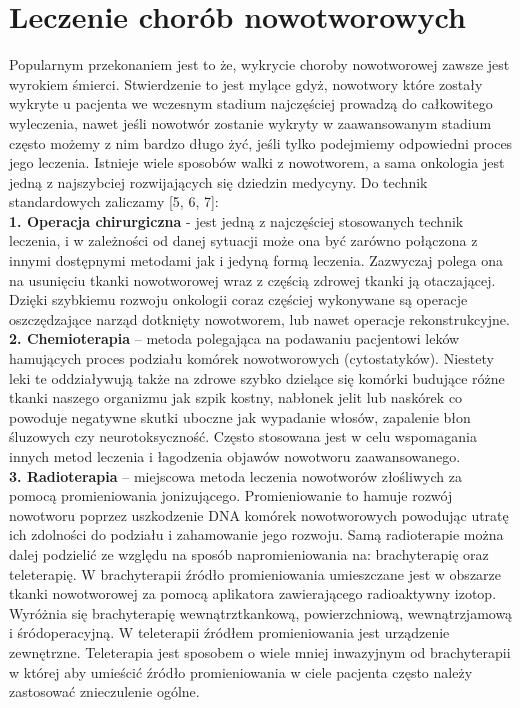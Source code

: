 \documentclass[a4paper,12pt,oneside]{book}
\begin{document}
\section{Leczenie chorób nowotworowych}
Popularnym przekonaniem jest to że, wykrycie choroby nowotworowej zawsze jest wyrokiem śmierci. Stwierdzenie to jest mylące gdyż, nowotwory które zostały wykryte u pacjenta we wczesnym stadium najczęściej prowadzą do całkowitego wyleczenia, nawet jeśli nowotwór zostanie wykryty w zaawansowanym stadium często możemy z nim bardzo długo żyć, jeśli tylko podejmiemy odpowiedni proces jego leczenia. Istnieje wiele sposobów walki z nowotworem, a sama onkologia jest jedną z najszybciej rozwijających się dziedzin medycyny.
Do technik standardowych zaliczamy [5, 6, 7]:\\
 \textbf{1. Operacja chirurgiczna} - jest jedną z najczęściej stosowanych technik leczenia, i w zależności od danej sytuacji może ona być zarówno połączona z innymi dostępnymi metodami jak i jedyną formą leczenia. Zazwyczaj polega ona na usunięciu tkanki nowotworowej wraz z częścią zdrowej tkanki ją otaczającej. Dzięki szybkiemu rozwoju onkologii coraz częściej wykonywane są operacje oszczędzające narząd dotknięty nowotworem, lub nawet operacje rekonstrukcyjne.\\
\textbf{2. Chemioterapia} – metoda polegająca na podawaniu pacjentowi leków hamujących proces podziału komórek nowotworowych (cytostatyków). Niestety leki te oddziaływują także na zdrowe szybko dzielące się komórki budujące różne tkanki naszego organizmu jak szpik kostny, nabłonek jelit lub naskórek co powoduje negatywne skutki uboczne jak wypadanie włosów, zapalenie błon śluzowych czy neurotoksyczność. Często stosowana jest w celu wspomagania innych metod leczenia i łagodzenia objawów nowotworu zaawansowanego.\\
\textbf{3. Radioterapia} – miejscowa metoda leczenia nowotworów złośliwych za pomocą promieniowania jonizującego. Promieniowanie to hamuje rozwój nowotworu poprzez uszkodzenie DNA komórek nowotworowych powodując utratę ich zdolności do podziału i zahamowanie jego rozwoju. Samą radioterapie można dalej podzielić ze względu na sposób napromieniowania na: brachyterapię oraz teleterapię. W brachyterapii źródło promieniowania umieszczane jest w obszarze tkanki nowotworowej za pomocą aplikatora zawierającego radioaktywny izotop. Wyróżnia się brachyterapię wewnątrztkankową, powierzchniową, wewnątrzjamową i śródoperacyjną. W teleterapii źródłem promieniowania jest urządzenie zewnętrzne. Teleterapia jest sposobem o wiele mniej inwazyjnym od brachyterapii w której aby umieścić źródło promieniowania w ciele pacjenta często należy zastosować znieczulenie ogólne.\\
\end{document}
